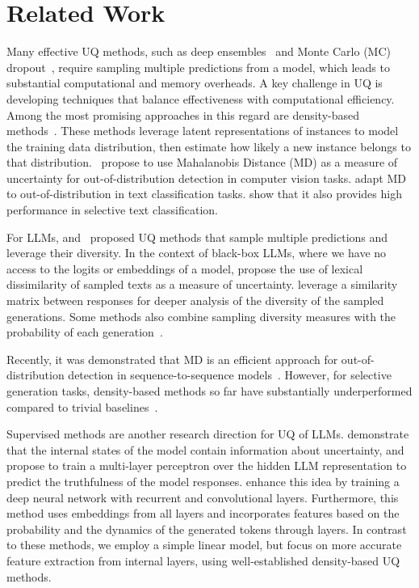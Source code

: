 \section{Related Work}
Many effective UQ methods, such as deep ensembles~\citep{NIPS2017_9ef2ed4b} and Monte Carlo (MC) dropout~\citep{gal2016dropout}, require sampling multiple predictions from a model, which leads to substantial computational and memory overheads. A key challenge in UQ is developing techniques that balance effectiveness with computational efficiency. Among the most promising approaches in this regard are density-based methods~\cite{lee2018simple,NEURIPS2020_543e8374,ddu_amersfoort,nuq_kotelevskii,yoo-etal-2022-detection}. These methods leverage latent representations of instances to model the training data distribution, then estimate how likely a new instance belongs to that distribution.~\citet{lee2018simple} propose to use Mahalanobis Distance (MD) as a measure of uncertainty for out-of-distribution detection in computer vision tasks. \citet{podolskiy2021revisiting} adapt  MD  to out-of-distribution in text classification tasks. \citet{vazhentsev-etal-2022-uncertainty,vazhentsev-etal-2023-efficient} show that it also provides high performance in selective text classification.  

  For LLMs, \citet{fomicheva-etal-2020-unsupervised} and~\citet{kuhn2023semantic} proposed UQ methods that sample multiple predictions and leverage their diversity. In the context of black-box LLMs, where we have no access to the logits or embeddings of a model, \citet{fomicheva-etal-2020-unsupervised} propose the use of lexical dissimilarity of sampled texts as a measure of uncertainty. \citet{lin2023generating} leverage a similarity matrix between responses for deeper analysis of the diversity of the sampled generations. Some methods also combine sampling diversity measures with the probability of each generation~\cite{kuhn2023semantic,duan-etal-2024-shifting,nikitin2024kernel,cheng-vlachos-2024-measuring,chen2024eigenscore,vashurin2025cocoageneralizedapproachuncertainty}.

  Recently, it was demonstrated that MD is an efficient approach for out-of-distribution detection in sequence-to-sequence models~\cite{vazhentsev-etal-2023-efficient,ren2023outofdistribution,darrin-etal-2023-rainproof}. However, for selective generation tasks, density-based methods so far have substantially underperformed compared to trivial baselines~\citep{vashurin2024benchmakring}.

  Supervised methods are another research direction for UQ of LLMs. \citet{azaria-mitchell-2023-internal} demonstrate that the internal states of the model contain information about uncertainty, and propose to train a multi-layer perceptron over the hidden LLM representation to predict the truthfulness of the model responses. \citet{he-etal-2024-llm} enhance this idea by training a deep neural network with recurrent and convolutional layers. Furthermore, this method uses embeddings from all layers and incorporates features based on the probability and the dynamics of the generated tokens through layers. In contrast to these methods, we employ a simple linear model, but focus on more accurate feature extraction from internal layers, using well-established density-based UQ methods.